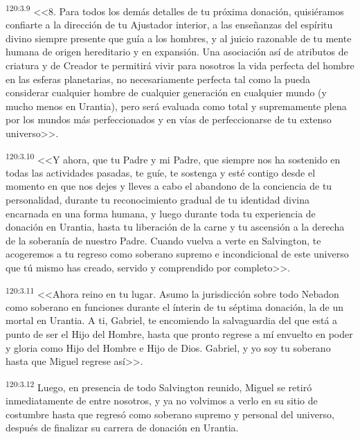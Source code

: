 \par 
\textsuperscript{120:3.9} <<8. Para todos los demás detalles de tu próxima donación, quisiéramos confiarte a la dirección de tu Ajustador interior, a las enseñanzas del espíritu divino siempre presente que guía a los hombres, y al juicio razonable de tu mente humana de origen hereditario y en expansión. Una asociación así de atributos de criatura y de Creador te permitirá vivir para nosotros la vida perfecta del hombre en las esferas planetarias, no necesariamente perfecta tal como la pueda considerar cualquier hombre de cualquier generación en cualquier mundo (y mucho menos en Urantia), pero será evaluada como total y supremamente plena por los mundos más perfeccionados y en vías de perfeccionarse de tu extenso universo>>.

\par 
\textsuperscript{120:3.10} <<Y ahora, que tu Padre y mi Padre, que siempre nos ha sostenido en todas las actividades pasadas, te guíe, te sostenga y esté contigo desde el momento en que nos dejes y lleves a cabo el abandono de la conciencia de tu personalidad, durante tu reconocimiento gradual de tu identidad divina encarnada en una forma humana, y luego durante toda tu experiencia de donación en Urantia, hasta tu liberación de la carne y tu ascensión a la derecha de la soberanía de nuestro Padre. Cuando vuelva a verte en Salvington, te acogeremos a tu regreso como soberano supremo e incondicional de este universo que tú mismo has creado, servido y comprendido por completo>>.

\par 
\textsuperscript{120:3.11} <<Ahora reino en tu lugar. Asumo la jurisdicción sobre todo Nebadon como soberano en funciones durante el ínterin de tu séptima donación, la de un mortal en Urantia. A ti, Gabriel, te encomiendo la salvaguardia del que está a punto de ser el Hijo del Hombre, hasta que pronto regrese a mí envuelto en poder y gloria como Hijo del Hombre e Hijo de Dios. Gabriel, y yo soy tu soberano hasta que Miguel regrese así>>.

\par 
\textsuperscript{120:3.12} Luego, en presencia de todo Salvington reunido, Miguel se retiró inmediatamente de entre nosotros, y ya no volvimos a verlo en su sitio de costumbre hasta que regresó como soberano supremo y personal del universo, después de finalizar su carrera de donación en Urantia.

